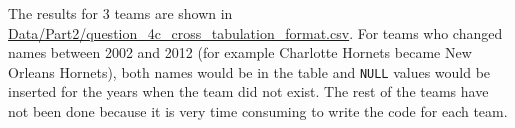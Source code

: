 \paragragh{}The results for 3 teams are shown in \url{Data/Part2/question_4c_cross_tabulation_format.csv}.  For teams who changed names between 2002 and 2012 (for example Charlotte Hornets became New Orleans Hornets), both names would be in the table and \verb|NULL| values would be inserted for the years when the team did not exist. The rest of the teams have not been done because it is very time consuming to write the code for each team.
